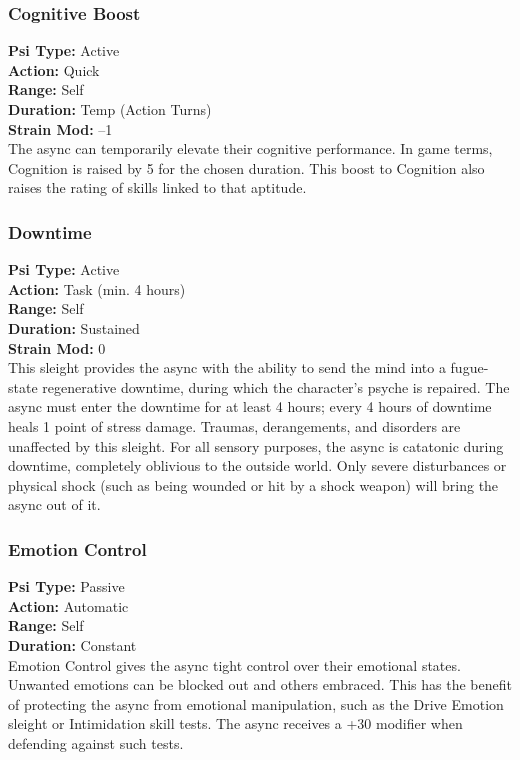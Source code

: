 \subsubsection{Cognitive Boost}
\textbf{Psi Type:} Active \\ 
\textbf{Action:} Quick \\ 
\textbf{Range:} Self \\ 
\textbf{Duration:} Temp (Action Turns) \\
\textbf{Strain Mod:} –1 \\
The async can temporarily elevate their cognitive
performance. In game terms, Cognition is raised by 5
for the chosen duration. This boost to Cognition also
raises the rating of skills linked to that aptitude.

\subsubsection{Downtime}
\textbf{Psi Type:} Active \\ 
\textbf{Action:} Task (min. 4 hours) \\ 
\textbf{Range:} Self \\ 
\textbf{Duration:} Sustained \\
\textbf{Strain Mod:} 0 \\
This sleight provides the async with the ability
to send the mind into a fugue-state regenerative
downtime, during which the character’s psyche is
repaired. The async must enter the downtime for
at least 4 hours; every 4 hours of downtime heals
1 point of stress damage. Traumas, derangements,
and disorders are unaffected by this sleight. For
all sensory purposes, the async is catatonic during
downtime, completely oblivious to the outside
world. Only severe disturbances or physical shock
(such as being wounded or hit by a shock weapon)
will bring the async out of it.

\subsubsection{Emotion Control}
\textbf{Psi Type:} Passive \\ 
\textbf{Action:} Automatic \\ 
\textbf{Range:} Self \\ 
\textbf{Duration:} Constant \\
Emotion Control gives the async tight control
over their emotional states. Unwanted emotions
can be blocked out and others embraced. This has
the benefit of protecting the async from emotional
manipulation, such as the Drive Emotion sleight or
Intimidation skill tests. The async receives a +30
modifier when defending against such tests.

